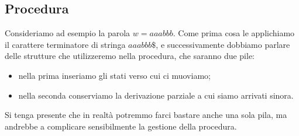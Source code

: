 \documentclass[class=book, crop=false, oneside, 12pt]{standalone}
\begin{document}
\subsection{Procedura}
Consideriamo ad esempio la parola \(w = aaabbb\). Come prima cosa le applichiamo il carattere terminatore di stringa \(aaabbb\$\), e successivamente dobbiamo parlare delle strutture che utilizzeremo nella procedura, che saranno due pile:
\begin{itemize}
    \item nella prima inseriamo gli stati verso cui ci muoviamo;
    \item nella seconda conserviamo la derivazione parziale a cui siamo arrivati sinora.
\end{itemize}
Si tenga presente che in realtà potremmo farci bastare anche una sola pila, ma andrebbe a complicare sensibilmente la gestione della procedura.
\end{document}

